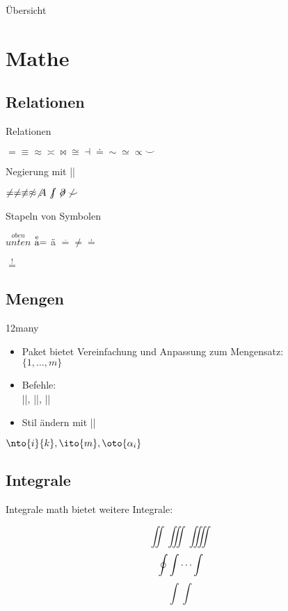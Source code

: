 \documentclass[
	vorläufig=false,
	datum=2016-11-18,
	titel={Mathematiksatz II},
	web=false,
]{../tex/latexkurs-slides}
\begin{document}
\begin{frame}{Übersicht}
	\tableofcontents
\end{frame}



\section{Mathe}
\subsection{Relationen}
\begin{frame}[fragile]{Relationen}
\begin{LTXexample}
$= \equiv \approx \asymp \bowtie \cong \dashv \doteq \sim \simeq \propto \smile$
\end{LTXexample}
\pause Negierung mit |\not|

\begin{LTXexample} 
$\not = \neq \not\equiv
\not \approx \not A
\not\kern-.2em\int \not\kern-.2em\partial \not \smile$
\end{LTXexample}
\pause Stapeln von Symbolen

\begin{LTXexample}
$\stackrel{oben}{unten}$
$\stackrel{\text e}{\text a} = $ ä
$\stackrel . = \neq \doteq$
\end{LTXexample}
\hfill$\stackrel !=$
\end{frame}


\subsection{Mengen}
\begin{frame}[fragile]{12many}
\begin{itemize}
\item Paket  bietet Vereinfachung und Anpassung zum Mengensatz:\\%
$\{1, \dots, m\}$
\item Befehle:\\
||, ||, ||
\item Stil ändern mit ||
\end{itemize}
\begin{LTXexample}[width=.6\textwidth]
$ \nto{i}{k},
  \ito{m},
  \oto{\alpha_i} $
\end{LTXexample}
\end{frame}


\subsection{Integrale}
\begin{frame}[fragile]{Integrale}
\AmS{}math bietet weitere Integrale:
\begin{LTXexample}[width=.45\textwidth]
\[ \iint \iiint \iiiint \]
\[ \oint \idotsint \]
\[ \int \int \]
\end{LTXexample}
\end{frame}
\end{document}
